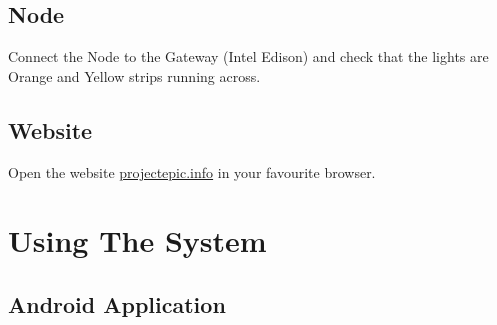 \documentclass[a4paper,12pt,titlepage]{article}
\begin{document}
\subsection{Node}
Connect the Node to the Gateway (Intel Edison) and check that the lights are Orange and Yellow strips running across.

\subsection{Website}
Open the website \url{projectepic.info} in your favourite browser.


\newpage
\section{Using The System}

\subsection{Android Application}
\end{document}
